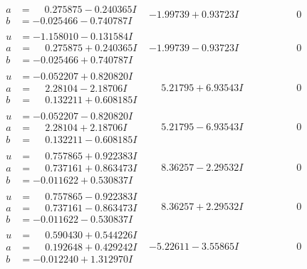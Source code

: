 \documentclass[1p]{elsarticle_modified}
\theoremstyle{definition}
\begin{document}
$$\begin{array}{c|c|c}
\begin{aligned}
a &= \phantom{-}0.275875 - 0.240365 I \\
b &= -0.025466 - 0.740787 I\end{aligned}
 & -1.99739 + 0.93723 I & \phantom{-0.000000 } 0 \\ \hline\begin{aligned}
u &= -1.158010 - 0.131584 I \\
a &= \phantom{-}0.275875 + 0.240365 I \\
b &= -0.025466 + 0.740787 I\end{aligned}
 & -1.99739 - 0.93723 I & \phantom{-0.000000 } 0 \\ \hline\begin{aligned}
u &= -0.052207 + 0.820820 I \\
a &= \phantom{-}2.28104 - 2.18706 I \\
b &= \phantom{-}0.132211 + 0.608185 I\end{aligned}
 & \phantom{-}5.21795 + 6.93543 I & \phantom{-0.000000 } 0 \\ \hline\begin{aligned}
u &= -0.052207 - 0.820820 I \\
a &= \phantom{-}2.28104 + 2.18706 I \\
b &= \phantom{-}0.132211 - 0.608185 I\end{aligned}
 & \phantom{-}5.21795 - 6.93543 I & \phantom{-0.000000 } 0 \\ \hline\begin{aligned}
u &= \phantom{-}0.757865 + 0.922383 I \\
a &= \phantom{-}0.737161 + 0.863473 I \\
b &= -0.011622 + 0.530837 I\end{aligned}
 & \phantom{-}8.36257 - 2.29532 I & \phantom{-0.000000 } 0 \\ \hline\begin{aligned}
u &= \phantom{-}0.757865 - 0.922383 I \\
a &= \phantom{-}0.737161 - 0.863473 I \\
b &= -0.011622 - 0.530837 I\end{aligned}
 & \phantom{-}8.36257 + 2.29532 I & \phantom{-0.000000 } 0 \\ \hline\begin{aligned}
u &= \phantom{-}0.590430 + 0.544226 I \\
a &= \phantom{-}0.192648 + 0.429242 I \\
b &= -0.012240 + 1.312970 I\end{aligned}
 & -5.22611 - 3.55865 I & \phantom{-0.000000 } 0\\

\end{array}$$
\end{document}
